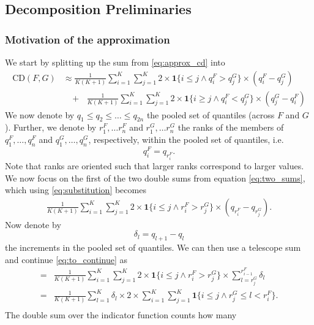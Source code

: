 \documentclass[
]{article}
\begin{document}
\hypertarget{decomposition-preliminaries}{%
\subsection{Decomposition
Preliminaries}\label{decomposition-preliminaries}}

\hypertarget{motivation-of-the-approximation}{%
\subsubsection{Motivation of the
approximation}\label{motivation-of-the-approximation}}

We start by splitting up the sum from \eqref{eq:approx_cd} into
\begin{align}
\text{CD}(F, G) & \approx \frac{1}{K(K + 1)}\sum_{i = 1}^K\sum_{j = 1}^K 2 \times \mathbf{1}\{i \leq j \land q^F_i > q^G_j\} \times \left( q^F_i - q^G_j\right) \label{eq:two_sums} \\
& \ \ \ \ + \ \ \ \frac{1}{K(K + 1)}\sum_{i = 1}^K\sum_{j = 1}^K 2 \times \mathbf{1}\{i \geq j \land q^F_i < q^G_j\} \times \left( q^G_j - q^F_i\right) \nonumber
\end{align} We now denote by \(q_1 \leq q_2 \leq \dots \leq q_{2n}\) the
pooled set of quantiles (across \(F\) and \(G\)). Further, we denote by
\(r^F_1, \dots r^F_n\) and \(r^G_1, \dots r^G_n\) the ranks of the
members of \(q^F_1, \dots, q^F_n\) and \(q^G_1, \dots, q^G_n\),
respectively, within the pooled set of quantiles, i.e. \begin{equation}
q^F_i = q_{r^F_i}.\label{eq:substitution}
\end{equation} Note that ranks are oriented such that larger ranks
correspond to larger values. We now focus on the first of the two double
sums from equation \eqref{eq:two_sums}, which using
\eqref{eq:substitution} becomes \begin{align}
\frac{1}{K(K + 1)}\sum_{i = 1}^K\sum_{j = 1}^K 2 \times \mathbf{1}\{i \leq j \land r^F_i > r^G_j\} \times \left( q_{r^F_i} - q_{r^G_j}\right). \label{eq:to_continue}
\end{align} Now denote by \[
\delta_l = q_{l + 1} - q_l
\] the increments in the pooled set of quantiles. We can then use a
telescope sum and continue \eqref{eq:to_continue} as \begin{align}
= & \frac{1}{K(K + 1)}\sum_{i = 1}^K\sum_{j = 1}^K 2 \times \mathbf{1}\{i \leq j \land r^F_i > r^G_j\} \times \sum_{l = r^G_j}^{r^F_{i - 1}} \delta_l\\
= & \frac{1}{K(K + 1)} \sum_{l = 1}^{K} \delta_l \times 2 \times \sum_{i = 1}^K\sum_{j = 1}^K \mathbf{1}\{i \leq j \land r^G_j \leq l < r^F_i\}. \label{eq:second_sum2}\\
\end{align} The double sum over the indicator function counts how many
\end{document}
